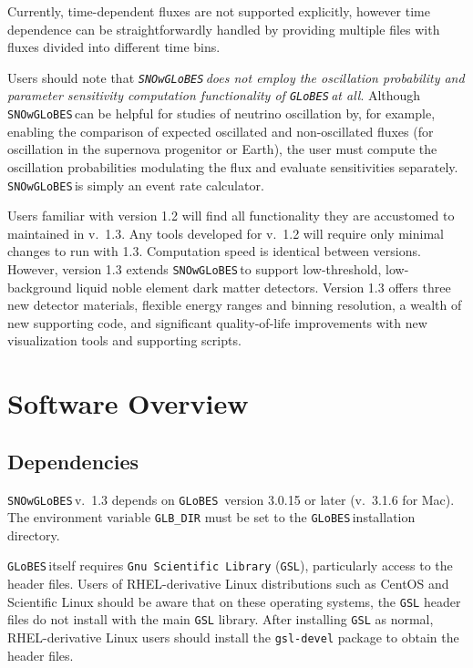\documentclass{article}
\newcommand{\snow}{\texttt{SNOwGLoBES}\,}
\newcommand{\glb}{\texttt{GLoBES}\,}
\begin{document}
Currently, time-dependent fluxes are not supported explicitly, however time dependence can be straightforwardly handled by providing multiple files with fluxes divided into different time bins.

Users should note that \textit{\snow does not employ the oscillation probability and parameter sensitivity computation functionality of \glb at all}.  Although \snow can be helpful for studies of neutrino oscillation by, for example, enabling the comparison of expected  oscillated and non-oscillated fluxes (for oscillation in the supernova progenitor or Earth), the user must compute the oscillation probabilities modulating the flux and evaluate sensitivities separately. \snow is simply an event rate calculator.

Users familiar with version 1.2 will find all functionality they are accustomed to maintained in v.~1.3. Any tools developed for v.~1.2 will require only minimal changes to run with 1.3. Computation speed is identical between versions. However, version 1.3 extends \snow to support low-threshold, low-background liquid noble element dark matter detectors. Version 1.3 offers three new detector materials, flexible energy ranges and binning resolution, a wealth of new supporting code, and significant quality-of-life improvements with new visualization tools and supporting scripts.


\section{Software Overview} \label{sec:soft.overview}

\subsection{Dependencies}
\snow v.~1.3 depends on \glb \cite{globes} version 3.0.15 or later (v.~3.1.6 for Mac). The environment variable \texttt{GLB\_DIR} must be set to the \glb installation directory.

\glb itself requires \texttt{Gnu Scientific Library} (\texttt{GSL}), particularly access to the header files. Users of RHEL-derivative Linux distributions such as CentOS and Scientific Linux should be aware that on these operating systems, the \texttt{GSL} header files do not install with the main \texttt{GSL} library. After installing \texttt{GSL} as normal, RHEL-derivative Linux users should install the \texttt{gsl-devel} package to obtain the header files.
\end{document}

